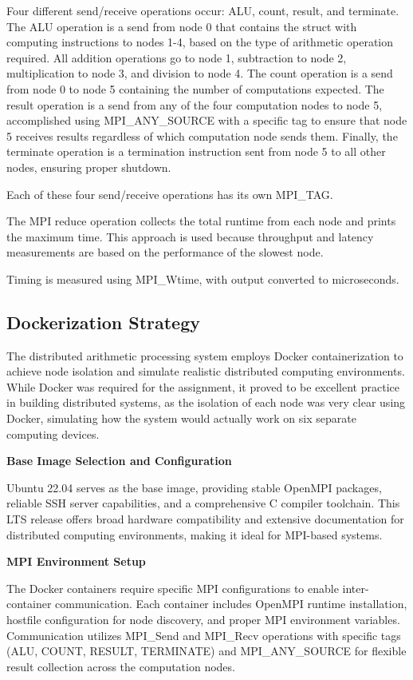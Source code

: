 \documentclass{article}
\begin{document}
Four different send/receive operations occur: ALU, count, result, and terminate. The ALU operation is a send from node 0 that contains the struct with computing instructions to nodes 1-4, based on the type of arithmetic operation required. All addition operations go to node 1, subtraction to node 2, multiplication to node 3, and division to node 4. The count operation is a send from node 0 to node 5 containing the number of computations expected. The result operation is a send from any of the four computation nodes to node 5, accomplished using MPI\_ANY\_SOURCE with a specific tag to ensure that node 5 receives results regardless of which computation node sends them. Finally, the terminate operation is a termination instruction sent from node 5 to all other nodes, ensuring proper shutdown.

Each of these four send/receive operations has its own MPI\_TAG.

The MPI reduce operation collects the total runtime from each node and prints the maximum time. This approach is used because throughput and latency measurements are based on the performance of the slowest node.

Timing is measured using MPI\_Wtime, with output converted to microseconds.

\subsection{Dockerization Strategy}
The distributed arithmetic processing system employs Docker containerization to achieve node isolation and simulate realistic distributed computing environments. While Docker was required for the assignment, it proved to be excellent practice in building distributed systems, as the isolation of each node was very clear using Docker, simulating how the system would actually work on six separate computing devices.

\textbf{Base Image Selection and Configuration}

Ubuntu 22.04 serves as the base image, providing stable OpenMPI packages, reliable SSH server capabilities, and a comprehensive C compiler toolchain. This LTS release offers broad hardware compatibility and extensive documentation for distributed computing environments, making it ideal for MPI-based systems.

\textbf{MPI Environment Setup}

The Docker containers require specific MPI configurations to enable inter-container communication. Each container includes OpenMPI runtime installation, hostfile configuration for node discovery, and proper MPI environment variables. Communication utilizes MPI\_Send and MPI\_Recv operations with specific tags (ALU, COUNT, RESULT, TERMINATE) and MPI\_ANY\_SOURCE for flexible result collection across the computation nodes.
\end{document}
